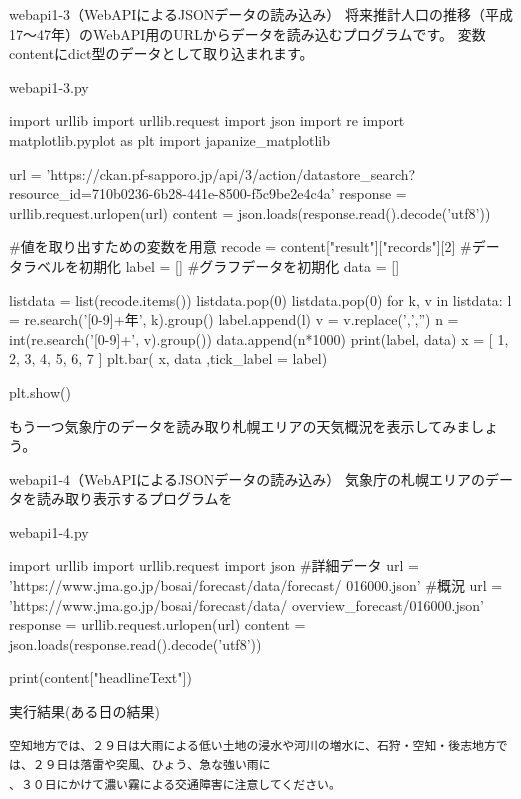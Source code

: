 \begin{pabox}{webapi1-3（WebAPIによるJSONデータの読み込み）}
将来推計人口の推移（平成17～47年）のWebAPI用のURLからデータを読み込むプログラムです。
変数contentにdict型のデータとして取り込まれます。
\begin{legbox}{webapi1-3.py}
\begin{listing}{1}
import urllib
import urllib.request
import json
import re
import matplotlib.pyplot as plt
import japanize_matplotlib

url = 'https://ckan.pf-sapporo.jp/api/3/action/datastore_search?
      resource_id=710b0236-6b28-441e-8500-f5c9be2e4c4a'
response = urllib.request.urlopen(url)
content = json.loads(response.read().decode('utf8'))

#値を取り出すための変数を用意
recode = content["result"]["records"][2]
#データラベルを初期化
label = []
#グラフデータを初期化
data = []

listdata = list(recode.items()) 
listdata.pop(0)
listdata.pop(0)
for k, v in listdata:
    l = re.search('[0-9]+年', k).group()
    label.append(l)
    v = v.replace(',','')
    n = int(re.search('[0-9]+', v).group())
    data.append(n*1000)
print(label, data)
x = [ 1, 2, 3, 4, 5, 6, 7 ]
plt.bar( x, data ,tick_label = label)

plt.show()
\end{listing}
\end{legbox}
\end{pabox}

もう一つ気象庁のデータを読み取り札幌エリアの天気概況を表示してみましょう。
\begin{pabox}{webapi1-4（WebAPIによるJSONデータの読み込み）}
気象庁の札幌エリアのデータを読み取り表示するプログラムを
\begin{legbox}{webapi1-4.py}
\begin{listing}{1}
import urllib
import urllib.request
import json
#詳細データ
url = 'https://www.jma.go.jp/bosai/forecast/data/forecast/
      016000.json'
#概況
url = 'https://www.jma.go.jp/bosai/forecast/data/
      overview_forecast/016000.json'
response = urllib.request.urlopen(url)
content = json.loads(response.read().decode('utf8'))

print(content["headlineText"])

\end{listing}
実行結果(ある日の結果)
\begin{verbatim}
空知地方では、２９日は大雨による低い土地の浸水や河川の増水に、石狩・空知・後志地方では、２９日は落雷や突風、ひょう、急な強い雨に
、３０日にかけて濃い霧による交通障害に注意してください。
\end{verbatim}
\end{legbox}
\end{pabox}